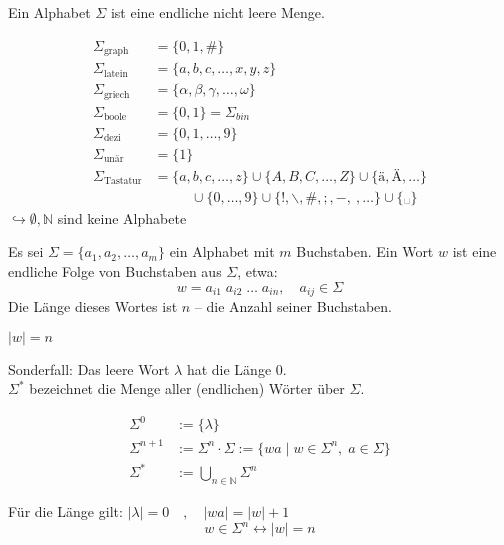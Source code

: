 \documentclass[runningheads,deutsch]{llncs}
\begin{document}
\begin{definition}
    Ein Alphabet $\Sigma$ ist eine endliche nicht leere Menge.
\end{definition}

\begin{example}
    \begin{align}
        \Sigma_{\text{graph}} &= \{ 0, 1, \# \} \\
        \Sigma_{\text{latein}} &= \{ a, b, c, \dots, x, y, z \} \\
        \Sigma_{\text{griech}} &= \{ \alpha, \beta, \gamma, \dots, \omega \} \\
        \Sigma_{\text{boole}} &= \{0, 1\} = \Sigma_{bin} \\
        \Sigma_{\text{dezi}} &= \{0, 1, \dots, 9\} \\
        \Sigma_{\text{unär}} &= \{1\} \\
        \Sigma_{\text{Tastatur}} &= \{a, b, c, \dots, z\} \cup \{A, B, C, \dots, Z\} \cup \{\text{ä}, \text{Ä}, \dots\} \\
        &\phantom{==} \cup \{0, \dots, 9\} \cup \{!, \backslash, \#, ;, -, ~, \dots\} \cup \{\text{␣}\}
    \end{align}
    $\hookrightarrow \emptyset, \mathbb{N}$ sind keine Alphabete
\end{example}

\begin{definition}
    Es sei $\Sigma = \{a_1, a_2, \dots, a_m\}$ ein Alphabet mit $m$ Buchstaben. Ein Wort $w$ ist eine endliche Folge von Buchstaben aus $\Sigma$, etwa:
    \[ w = a_{i1} \; a_{i2} \; \dots \; a_{in}, \quad a_{ij} \in \Sigma \]
    Die Länge dieses Wortes ist $n$ -- die Anzahl seiner Buchstaben.
    \begin{note}
        $|w| = n$
    \end{note}
    Sonderfall: Das leere Wort $\lambda$ hat die Länge 0. \\
    $\Sigma^*$ bezeichnet die Menge aller (endlichen) Wörter über $\Sigma$.

    \begin{align}
        \Sigma^0 &:= \{\lambda\} \\
        \Sigma^{n+1} &:= \Sigma^n \cdot \Sigma := \{wa\;|\;w \in \Sigma^n,\;a \in \Sigma\} \\
        \Sigma^* &:= \bigcup_{n\in \mathbb{N}} \Sigma^n
    \end{align}
\end{definition}

Für die Länge gilt: $|\lambda| = 0 \quad , \quad |wa| = |w| + 1$
\[ w \in \Sigma^n \leftrightarrow |w| = n \]
\end{document}
